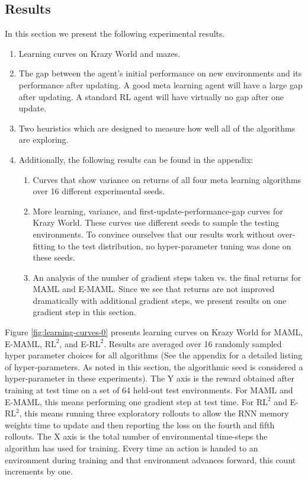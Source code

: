 \documentclass{article} %
\begin{document}
    
\subsection{Results} 
In this section we present the following experimental results. 
\begin{enumerate} 
\item Learning curves on Krazy World and mazes. 
\item The gap between the agent's initial performance on new environments and its performance after updating. A good meta learning agent will have a large gap after updating. A standard RL agent will have virtually no gap after one update. 
\item Two heuristics which are designed to measure how well all of the algorithms are exploring. 
\item Additionally, the following results can be found in the appendix: 
\begin{enumerate}
    \item Curves that show variance on returns of all four meta learning algorithms  over 16 different experimental seeds.  
    \item More learning, variance, and first-update-performance-gap curves for Krazy World. These curves use different seeds to sample the testing environments. To convince ourselves that our results work without over-fitting to the test distribution, no hyper-parameter tuning was done on these seeds.  
    \item An analysis of the number of gradient steps taken vs. the final returns for MAML and E-MAML. Since we see that returns are not improved dramatically with additional gradient steps, we present results on one gradient step in this section. 
\end{enumerate}
\end{enumerate}


Figure \ref{fig:learning-curves-0} presents learning curves on Krazy World for MAML, E-MAML, $\text{RL}^2$, and E-$\text{RL}^2$. Results are averaged over 16 randomly sampled hyper parameter choices for all algorithms (See the appendix for a detailed listing of hyper-parameters. As noted in this section, the algorithmic seed is considered a hyper-parameter in these experiments). The Y axis is the reward obtained after training at test time on a set of 64 held-out test environments. For MAML and E-MAML, this means performing one gradient step at test time. For $\text{RL}^2$ and E-$\text{RL}^2$, this means running three exploratory rollouts to allow the RNN memory weights time to update and then reporting the loss on the fourth and fifth rollouts. The X axis is the total number of environmental time-steps the algorithm has used for training. Every time an action is handed to an environment during training and that environment advances forward, this count increments by one. 
\end{document}
